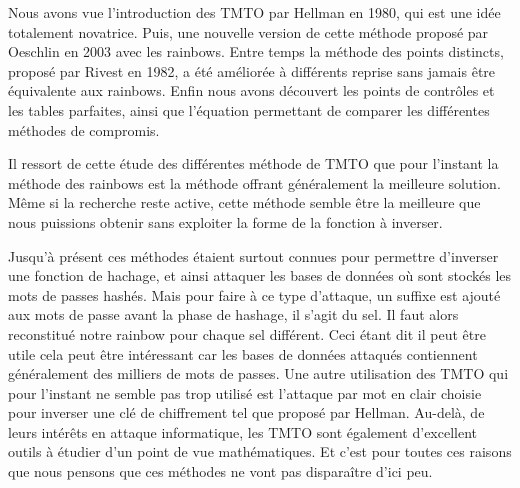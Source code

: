 
	Nous avons vue l'introduction des \gls{TMTO} par Hellman en 1980, qui est une idée totalement novatrice. Puis, une nouvelle version de cette méthode proposé par Oeschlin en 2003 avec les \glspl{rainbow}. Entre temps la méthode des points distincts, proposé par Rivest en 1982, a été améliorée à différents reprise sans jamais être équivalente aux \glspl{rainbow}. Enfin nous avons découvert les points de contrôles et les tables parfaites, ainsi que l'équation permettant de comparer les différentes méthodes de compromis.

	\bigskip

	Il ressort de cette étude des différentes méthode de \gls{TMTO} que pour l'instant la méthode des \glspl{rainbow} est la méthode offrant généralement la meilleure solution. Même si la recherche reste active, cette méthode semble être la meilleure que nous puissions obtenir sans exploiter la forme de la fonction à inverser.

	\bigskip

	Jusqu'à présent ces méthodes étaient surtout connues pour permettre d'inverser une fonction de hachage, et ainsi attaquer les bases de données où sont stockés les mots de passes hashés. Mais pour faire à ce type d'attaque, un suffixe est ajouté aux mots de passe avant la phase de hashage, il s'agit du sel. Il faut alors reconstitué notre \gls{rainbow} pour chaque sel différent. Ceci étant dit il peut être utile cela peut être intéressant car les bases de données attaqués contiennent généralement des milliers de mots de passes.
	\bigskip
	Une autre utilisation des \gls{TMTO} qui pour l'instant ne semble pas trop utilisé est l'attaque par mot en clair choisie pour inverser une clé de chiffrement tel que proposé par Hellman.
	\bigskip
	Au-delà, de leurs intérêts en attaque informatique, les \gls{TMTO} sont également d'excellent outils à étudier d'un point de vue mathématiques. Et c'est pour toutes ces raisons que nous pensons que ces méthodes ne vont pas disparaître d'ici peu. 

\endinput{}
